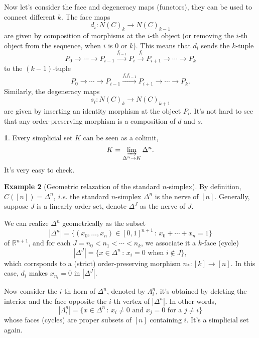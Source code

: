 \documentclass[12pt]{article}
\theoremstyle{definition}
\newtheorem{para}{}[section]
\newtheorem{exa}[para]{Example}
\theoremstyle{plain}
\begin{document}
Now let's consider the face and degeneracy maps (functors), they can be used to connect different $k$. The face maps 
\[
     d_{i}\colon N(C)_{k}\to N(C)_{k-1}
\]
are given by composition of morphisms at the $i$-th object (or removing the $i$-th object from the sequence, when $i$ is $0$ or $k$). This means that $d_i$ sends the $k$-tuple 
\[P_{0}\to \cdots \to P_{i-1}\xrightarrow{f_{i-1}} P_{i}\xrightarrow{f_{i}} P_{i+1}\to \cdots \to P_{k}\]
to the $(k-1)$-tuple 
\[P_{0}\to \cdots \to P_{i-1}\xrightarrow{f_if_{i-1}} P_{i+1}\to \cdots \to P_{k}.\]
Similarly, the degeneracy maps 
\[s_{i}:N(C)_{k}\to N(C)_{k+1}\] 
are given by inserting an identity morphism at the object $P_i$. It's not hard to see that any order-preserving morphism is a composition of $d$ and $s$.

\begin{para}
    Every simplicial set $K$ can be seen as a colimit,
    \[
        K = \varinjlim_{\Delta^n\to K}\Delta^n.
    \]
    It's very easy to check.
\end{para}

\begin{exa}[Geometric relazation of the standard $n$-simplex]
    By definition, $C([n]) = \Delta^n$, {\it i.e.} the standard $n$-simplex $\Delta^n$ is the nerve of $[n]$. Generally, suppose $J$ is a linearly order set, denote $\Delta^J$ as the nerve of $J$.
    
    We can realize $\Delta^n$ geometrically as the subset 
    \[
        |\Delta^n|=\{(x_0,\dots,x_n)\in [0,1]^{n+1}\,:\, x_0+\cdots+x_n=1\}
    \]
    of $\mathbb R^{n+1}$, and for each $J=n_0<n_1<\cdots<n_k$, we associate it a $k$-face (cycle)
    \[
        |\Delta^J|=\{x\in \Delta^n\,:\, x_i=0\text{ when $i\not\in J$}\},
    \]
    which corrsponds to a (strict) order-preserving morphism $n_*:[k] \to [n]$. In this case, $d_i$ makes $x_{n_i}=0$ in $|\Delta^J|$.

    Now consider the $i$-th horn of $\Delta^n$, denoted by $\Lambda_i^n$, it's obtained by deleting the interior and the face opposite the $i$-th vertex of $|\Delta^n|$. In other words, 
    \[
        |\Lambda_i^n| = \{x\in\Delta^n\,:\, x_i\neq 0 \text{ and  $x_j=0$ for a $j\neq i$}\}
    \]
    whose faces (cycles) are proper subsets of $[n]$ containing $i$. It's a simplicial set again.
\end{exa}
\end{document}
